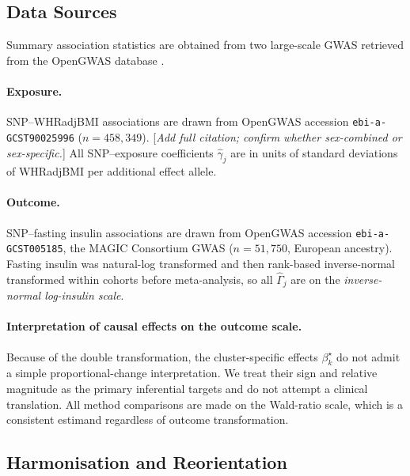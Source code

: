 \documentclass[12pt,a4paper]{article}
\newcommand{\bs}{\beta^{\star}}
\newcommand{\todo}[1]{\textcolor{notecol}{[\textit{#1}]}}
\begin{document}
\subsection{Data Sources}
\label{sec:whr:data}

Summary association statistics are obtained from two large-scale GWAS
retrieved from the OpenGWAS database \citep{Elsworth2020}.

\paragraph{Exposure.}
SNP--WHRadjBMI associations are drawn from OpenGWAS accession
\texttt{ebi-a-GCST90025996} ($n = 458{,}349$).
\todo{Add full citation; confirm whether sex-combined or sex-specific.}
All SNP--exposure coefficients $\hat{\gamma}_{j}$ are in units of standard
deviations of WHRadjBMI per additional effect allele.

\paragraph{Outcome.}
SNP--fasting insulin associations are drawn from OpenGWAS accession
\texttt{ebi-a-GCST005185}, the MAGIC Consortium GWAS \citep{Manning2012}
($n = 51{,}750$, European ancestry).  Fasting insulin was natural-log
transformed and then rank-based inverse-normal transformed within cohorts
before meta-analysis, so all $\hat{\Gamma}_{j}$ are on the
\emph{inverse-normal log-insulin scale}.

\paragraph{Interpretation of causal effects on the outcome scale.}
Because of the double transformation, the cluster-specific effects $\bs_{k}$
do not admit a simple proportional-change interpretation.  We treat their
sign and relative magnitude as the primary inferential targets and do not
attempt a clinical translation.  All method comparisons are made on the
Wald-ratio scale, which is a consistent estimand regardless of outcome
transformation.

\subsection{Harmonisation and Reorientation}
\label{sec:whr:harmonisation}
\end{document}
